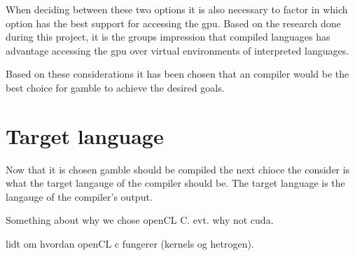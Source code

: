 When deciding between these two options it is also necessary to factor in which option has the best support for accessing the \gls{gpu}.
Based on the research done during this project, it is the groups impression that compiled languages has advantage accessing the \gls{gpu} over virtual environments of interpreted languages.

Based on these considerations it has been chosen that an compiler would be the best choice for \gls{gamble} to achieve the desired goals.

\section{Target language}
Now that it is chosen \gls{gamble} should be compiled the next chioce the consider is what the target langauge of the compiler should be.
The target language is the langauge of  the compiler's output.




Something about why we chose openCL C. 
 evt. why not cuda.

 lidt om hvordan openCL c fungerer (kernels og hetrogen).